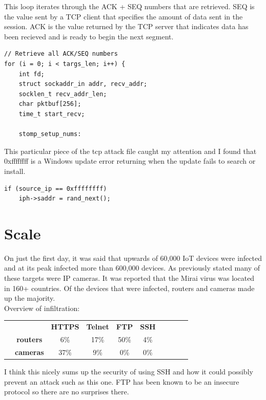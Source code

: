 \documentclass[12pt, letterpaper]{article}
\begin{document}
\begin{sloppypar}
\begin{flushleft}
This loop iterates through the ACK + SEQ numbers that are retrieved. SEQ is the value
sent by a TCP client that specifies the amount of data sent in the session. ACK is the 
value returned by the TCP server that indicates data has been recieved and is ready to
begin the next segment. 

\begin{lstlisting}
// Retrieve all ACK/SEQ numbers
for (i = 0; i < targs_len; i++) {
    int fd;
    struct sockaddr_in addr, recv_addr;
    socklen_t recv_addr_len;
    char pktbuf[256];
    time_t start_recv;

    stomp_setup_nums:
\end{lstlisting}

This particular piece of the tcp attack file caught my attention and I found
that 0xffffffff is a Windows update error returning when the update fails to search 
or install. 

\begin{lstlisting}
if (source_ip == 0xffffffff)
	iph->saddr = rand_next();
\end{lstlisting}


\section*{Scale}
On just the first day, it was said that upwards of 60,000 IoT devices were infected and at
its peak infected more than 600,000 devices. As previously stated many of these targets
were IP cameras. It was reported that the Mirai virus was located in 160+ countries. Of the
devices that were infected, routers and cameras made up the majority. \\

Overview of infiltration:
\begin{center}
\begin{table}[ht]
  \large  
  \centering 
  \renewcommand{\arraystretch}{1.5}
  \begin{tabular}{c|c||*{8}{c|}}
\cline{2-6}
&& \bfseries HTTPS & \bfseries Telnet & \bfseries FTP & \bfseries SSH \\
\cline{2-6}
&    \bfseries routers & 6\% &  17\% &  50\% & 4\% \\ 
    \cline{2-6}
&    \bfseries cameras & 37\% &  9\% &  0\% &  0\%  \\
    \cline{2-6}
  \end{tabular}
\end{table} 
\end{center}
I think this nicely sums up the security of using SSH and how it could possibly prevent an 
attack such as this one. FTP has been known to be an insecure protocol so there are no 
surprises there. 


\end{flushleft}
\end{sloppypar}
\end{document}
